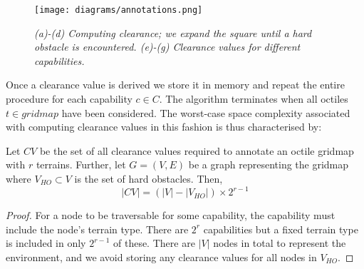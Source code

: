 \begin{figure}[htbp]
	\vspace{-9pt}
       \caption{\emph{(a)-(d) Computing clearance; we expand the square until a hard obstacle is encountered. (e)-(g) Clearance values for different capabilities.}}
       \begin{center}
                       \texttt{[image: diagrams/annotations.png]}
       \end{center}
       \label{aha-fig:annotations}
	\vspace{-6pt}
\end{figure}

Once a clearance value is derived we store it in memory and repeat the entire procedure for each capability $c \in C$.  
The algorithm terminates when all octiles $t \in gridmap$ have been considered. 
The worst-case space complexity associated with computing clearance values in this fashion is thus characterised by: 
\begin{lemma}
\label{aha-lemma:numannotations}
Let $CV$ be the set of all clearance values required to annotate an octile gridmap with $r$ terrains. Further, let $G = (V, E)$ be a graph representing the gridmap where $V_{HO} \subset V$ is the set of hard obstacles. Then, 
$$|CV| = (|V| - |V_{HO}|)\times 2^{r-1}$$
\end{lemma}

\begin{proof}
For a node to be traversable for some capability, the capability must include the node's terrain type. 
There are $2^{r}$ capabilities but a fixed terrain type is included in only $2^{r-1}$ of these. 
There are $|V|$ nodes in total to represent the environment, and we avoid storing any clearance values for all nodes in $V_{HO}$. 
\end{proof}

